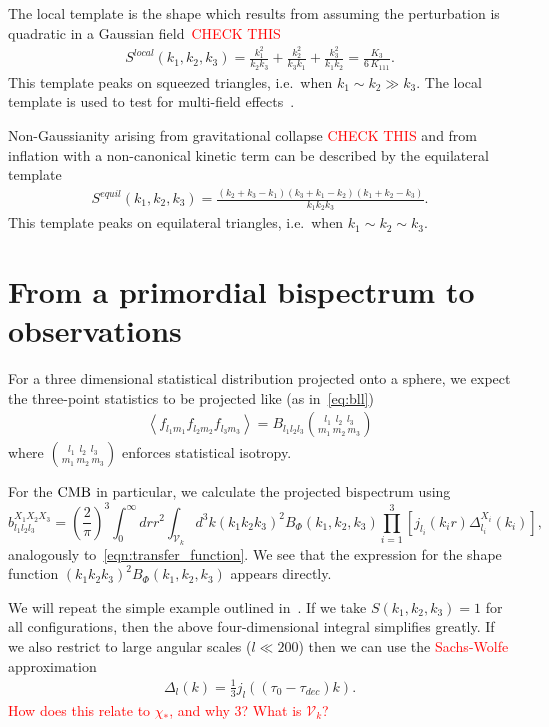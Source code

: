     The local template is the shape which results from assuming the perturbation is
    quadratic in a Gaussian field~\textcolor{red}{CHECK THIS}
\begin{align}\label{local_shape}
S^{local}(k_1,k_2,k_3) = \frac{k_1^2}{k_2k_3}+\frac{k_2^2}{k_3k_1}+\frac{k_3^2}{k_1k_2} = \frac{K_3}{6\,K_{111}}.
\end{align}
This template peaks on squeezed triangles, i.e.\ when $k_1\sim k_2\gg k_3$.
    The local template is used to test for multi-field effects~\cite{Planck_NG_2015}.


    Non-Gaussianity arising from gravitational collapse \textcolor{red}{CHECK THIS}
    and from inflation with a non-canonical kinetic term can be described by the
    equilateral template
\begin{align}\label{equil_shape}
    S^{equil}(k_1,k_2,k_3) = \frac{(k_2+k_3-k_1)(k_3+k_1-k_2)(k_1+k_2-k_3)}{k_1k_2k_3}.
\end{align}
This template peaks on equilateral triangles, i.e.\ when $k_1\sim k_2\sim k_3$.




\section{From a primordial bispectrum to observations}
    For a three dimensional statistical distribution projected onto
    a sphere, we expect the three-point statistics to be projected
    like (as in~\eqref{eq:bll})
    \begin{align}
        \left<f_{l_1m_1}f_{l_2m_2}f_{l_3m_3}\right> = B_{l_1l_2l_3}{{l_1~~l_2~~l_3} \choose {m_1~m_2~m_3}}
    \end{align}
    where ${{l_1~~l_2~~l_3} \choose {m_1~m_2~m_3}}$ enforces statistical isotropy.


    For the $\text{CMB}$ in particular, we calculate the projected bispectrum using
    \begin{equation}
    \label{eq:reduced_cmb}
    b^{X_1X_2X_3}_{l_1l_2l_3} = \left(\frac{2}{\pi}\right)^3\int_{0}^{\infty}drr^2
        \int_{\mathcal{V}_k}d^3k (k_1k_2k_3)^2 B_{\Phi}(k_1,k_2,k_3)\prod_{i=1}^{3}\left[j_{l_i}(k_ir)\Delta^{X_i}_{l_i}(k_i)\right],
    \end{equation}
    analogously to~\eqref{eqn:transfer_function}.
    We see that the expression for the shape function $(k_1k_2k_3)^2 B_{\Phi}(k_1,k_2,k_3)$ appears directly.


    We will repeat the simple example outlined in~\cite{FergShell_2}. If we
    take $S(k_1,k_2,k_3)=1$ for all configurations, then the above four-dimensional integral
    simplifies greatly. If we also restrict to large angular scales ($l\ll200$)
    then we can use the \textcolor{red}{Sachs-Wolfe} approximation
    \begin{align}
        \Delta_l(k) = \frac{1}{3}j_l((\tau_0-\tau_{dec})k).
    \end{align}
    \textcolor{red}{How does this relate to $\chi_*$, and why $3$? What is $\mathcal{V}_k$?}


